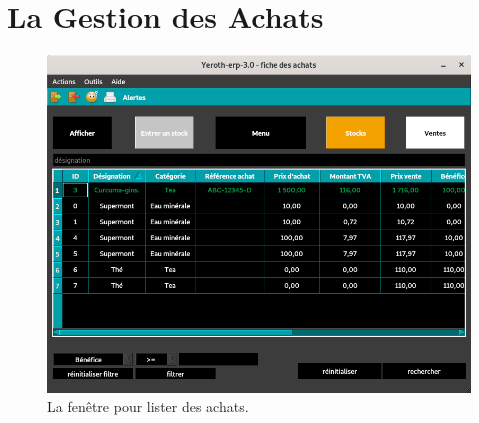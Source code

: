 \chapter{La Gestion des Achats}
\label{chap:gestion-des-achats}




\begin{figure}[!htbp]
\centering
\includegraphics[scale=0.63]{images/yeroth-lister-des-achats.png}
\caption{La fen\^etre pour lister des achats.}
\label{fig:fenetre-lister-des-achats}
\end{figure}